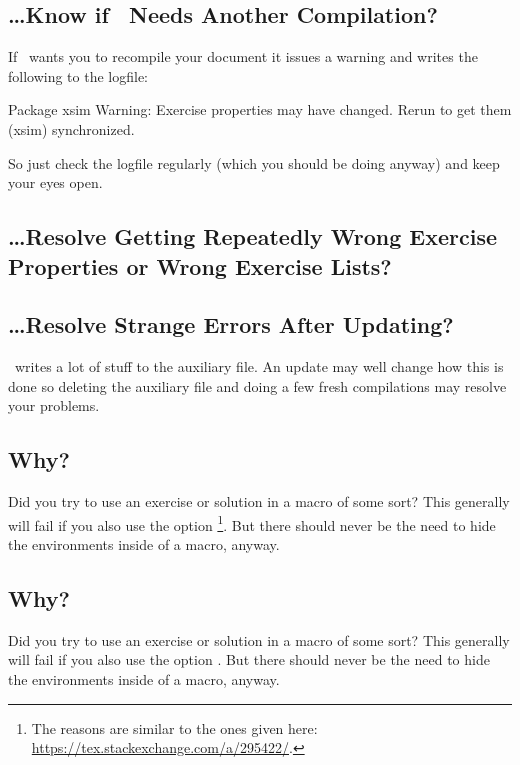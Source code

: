 \documentclass{xsim-manual}
\begin{document}
\subsection{\dots Know if \xsim\ Needs Another Compilation?}
If \xsim\ wants you to recompile your document it issues a warning and writes
the following to the logfile:
\begin{sourcecode}
  Package xsim Warning: Exercise properties may have changed. Rerun to get them
  (xsim)                synchronized.
\end{sourcecode}
So just check the logfile regularly (which you should be doing anyway) and
keep your eyes open.

\subsection{\dots Resolve Getting Repeatedly Wrong Exercise Properties or
  Wrong Exercise Lists?}\label{sec:resolve-getting}
\xsimauxfileinfo

\subsection{\dots Resolve Strange Errors After Updating?}
\xsim\ writes a lot of stuff to the auxiliary file.  An update may well change
how this is done so deleting the auxiliary file and doing a few fresh
compilations may resolve your problems.

\subsection{
  Why?}
Did you try to use an exercise or solution in a macro of some sort?  This
generally will fail if you also use the option \footnote{The
  reasons are similar to the ones given here:
  \url{https://tex.stackexchange.com/a/295422/}.}.  But there should never be
the need to hide the environments inside of a macro, anyway.

\subsection{ Why?}
Did you try to use an exercise or solution in a macro of some sort?  This
generally will fail if you also use the option .  But there
should never be the need to hide the environments inside of a macro, anyway.
\end{document}
